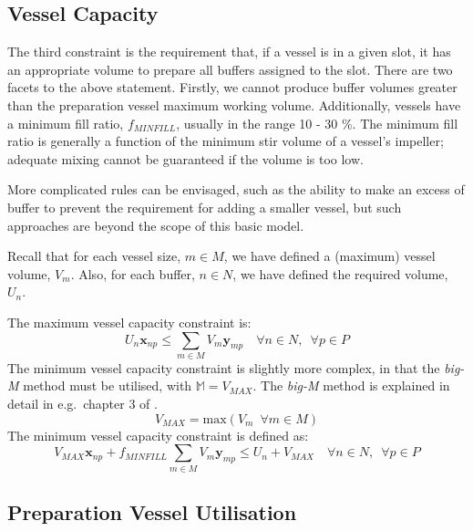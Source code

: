 \subsection{Vessel Capacity}\label{SS.constr3}

The third constraint is the requirement that, if a vessel is in a given slot,
it has an appropriate volume to prepare all buffers assigned to the slot.
There are two facets to the above statement.
Firstly, we cannot produce buffer volumes greater than the preparation vessel
maximum working volume.
Additionally, vessels have a minimum fill ratio, $f_{MINFILL}$, usually in the
range 10 - 30 \%.
The minimum fill ratio is generally a function of the minimum stir volume of a
vessel's impeller; adequate mixing cannot be guaranteed if the volume is too
low.

More complicated rules can be envisaged, such as the ability to make an excess
of buffer to prevent the requirement for adding a smaller vessel, but such
approaches are beyond the scope of this basic model.

Recall that for each vessel size, $m \in M$, we have defined a (maximum) vessel
volume, $V_{m}$. Also, for each buffer, $n \in N$, we have defined the required
volume, $U_{n}$.

The maximum vessel capacity constraint is:
\begin{equation}
    U_{n} \boldsymbol{x}_{np} \le \sum_{m \in M} V_{m} \boldsymbol{y}_{mp}
    \quad \forall n \in N, \enspace \forall p \in P
    \label{eq.constr3a}
\end{equation}
The minimum vessel capacity constraint is slightly more complex, in that the
\emph{big-M} method must be utilised, with $\mathbb{M} = V_{\mathit{MAX}}$.
The \emph{big-M} method is explained in detail in e.g.\ chapter 3 of 
\citet{Taha:2017}.
\begin{equation}
    V_{\mathit{MAX}} = \text{max} \left( V_{m} \enspace \forall m \in M \right)
\end{equation}
The minimum vessel capacity constraint is defined as:
\begin{equation}
    V_{\mathit{MAX}} \boldsymbol{x}_{np} + f_{\mathit{MINFILL}} \sum_{m \in M}
    V_{m} \boldsymbol{y}_{mp} \le U_{n} + V_{\mathit{MAX}} \quad \forall n \in
    N, \enspace \forall p \in P
    \label{eq.constr3b}
\end{equation}

\subsection{Preparation Vessel Utilisation}\label{SS.constr4}

